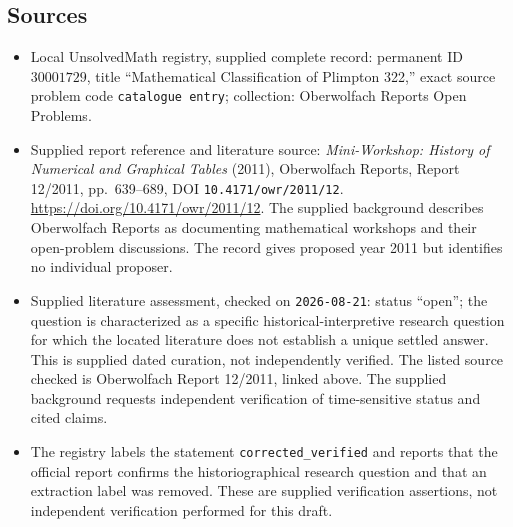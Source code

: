 \documentclass[11pt]{article}
\begin{document}
\subsection{Sources}
\begin{itemize}
\item Local UnsolvedMath registry, supplied complete record: permanent ID \(30001729\), title ``Mathematical Classification of Plimpton 322,'' exact source problem code \texttt{catalogue entry}; collection: Oberwolfach Reports Open Problems.
\item Supplied report reference and literature source: \emph{Mini-Workshop: History of Numerical and Graphical Tables} (2011), Oberwolfach Reports, Report 12/2011, pp.\ 639--689, DOI \texttt{10.4171/owr/2011/12}. \url{https://doi.org/10.4171/owr/2011/12}. The supplied background describes Oberwolfach Reports as documenting mathematical workshops and their open-problem discussions. The record gives proposed year 2011 but identifies no individual proposer.
\item Supplied literature assessment, checked on \texttt{2026-08-21}: status ``open''; the question is characterized as a specific historical-interpretive research question for which the located literature does not establish a unique settled answer. This is supplied dated curation, not independently verified. The listed source checked is Oberwolfach Report 12/2011, linked above. The supplied background requests independent verification of time-sensitive status and cited claims.
\item The registry labels the statement \texttt{corrected\_verified} and reports that the official report confirms the historiographical research question and that an extraction label was removed. These are supplied verification assertions, not independent verification performed for this draft.
\end{itemize}
\end{document}
